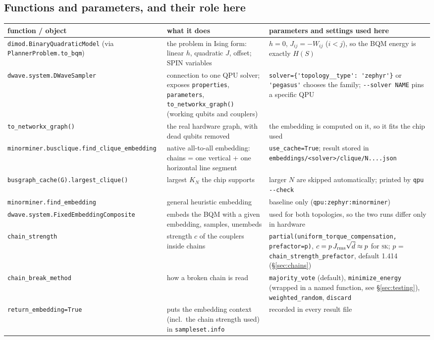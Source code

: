 \documentclass[11pt,a4paper]{article}
\newcommand{\code}[1]{\nolinkurl{#1}}
\newcommand{\SK}{\textsc{sk}}
\begin{document}
\subsection{Functions and parameters, and their role here}
{\small\begin{longtable}{L{4.0cm}L{5.4cm}L{5.6cm}}
\toprule
function / object & what it does & parameters and settings used here \\
\midrule\endhead
\code{dimod.BinaryQuadraticModel} (via \code{PlannerProblem.to_bqm}) & the problem in Ising form: linear $h$, quadratic $J$, offset; SPIN variables & $h=0$, $J_{ij}=-W_{ij}$ ($i<j$), so the BQM energy is exactly $H(S)$ \\
\code{dwave.system.DWaveSampler} & connection to one QPU solver; exposes \code{properties}, \code{parameters}, \code{to_networkx_graph()} (working qubits and couplers) & \code{solver={'topology__type': 'zephyr'}} or \code{'pegasus'} chooses the family; \code{--solver NAME} pins a specific QPU \\
\code{to_networkx_graph()} & the real hardware graph, with dead qubits removed & the embedding is computed on it, so it fits the chip used \\
\code{minorminer.busclique.find_clique_embedding} & native all-to-all embedding: chains = one vertical + one horizontal line segment & \code{use_cache=True}; result stored in \code{embeddings/<solver>/clique/N....json} \\
\code{busgraph_cache(G).largest_clique()} & largest $K_N$ the chip supports & larger $N$ are skipped automatically; printed by \code{qpu --check} \\
\code{minorminer.find_embedding} & general heuristic embedding & baseline only (\code{qpu:zephyr:minorminer}) \\
\code{dwave.system.FixedEmbeddingComposite} & embeds the BQM with a given embedding, samples, unembeds & used for both topologies, so the two runs differ only in hardware \\
\code{chain_strength} & strength $c$ of the couplers inside chains & \code{partial(uniform_torque_compensation, prefactor=p)}, $c=p\,J_{\rm rms}\sqrt{\bar d}\approx p$ for \SK; $p$ = \code{chain_strength_prefactor}, default 1.414 (\S\ref{sec:chains}) \\
\code{chain_break_method} & how a broken chain is read & \code{majority_vote} (default), \code{minimize_energy} (wrapped in a named function, see \S\ref{sec:testing}), \code{weighted_random}, \code{discard} \\
\code{return_embedding=True} & puts the embedding context (incl.\ the chain strength used) in \code{sampleset.info} & recorded in every result file \\

\end{longtable}}
\end{document}
